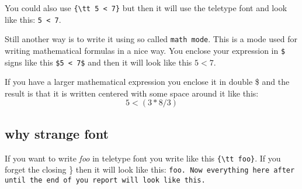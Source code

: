 \documentclass[a4paper,11pt]{article}
\begin{document}
You could also use {\tt \{\textbackslash tt 5 < 7\}} but then it
will use the teletype font and look like this: {\tt 5 < 7}.

Still another way is to write it using so called {\tt math mode}. This
is a mode used for writing mathematical formulas in a nice way. You
enclose your expression in {\tt \$} signs like this {\tt \$5 < 7\$}
and then it will look like this $5 < 7$.

If you have a larger mathematical expression you enclose it in double
\$ and the result is that it is written centered with some space
around it like this:  $$ 5 < (3 * 8 / 3 ) $$

\subsection*{why strange font}

If you want to write {\em foo} in teletype font you write like this
\verb+{\tt foo}+. If you forget the closing \} then it will look like
this: {\tt foo. Now everything here after until the end of you report
will look like this. }
\end{document}

